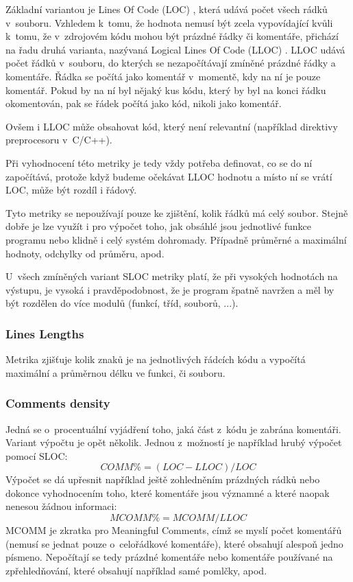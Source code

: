 \documentclass[11pt,twoside,a4paper]{book}
\begin{document}
Základní variantou je Lines Of Code (LOC) \cite{SLOC}, která udává počet všech rádků v~souboru. Vzhledem k~tomu, že hodnota
nemusí být zcela vypovídající kvůli k~tomu, že v~zdrojovém kódu mohou být prázdné řádky či komentáře, přichází
na řadu druhá varianta, nazývaná Logical Lines Of Code (LLOC) \cite{LLOC}. LLOC
udává počet řádků v~souboru, do kterých se nezapočítávají zmíněné prázdné řádky a komentáře. Řádka se počítá jako komentář
v~momentě, kdy na ní je pouze komentář. Pokud by na ní byl nějaký kus kódu, který by byl na konci řádku okomentován,
pak se řádek počítá jako kód, nikoli jako komentář.

Ovšem i LLOC může obsahovat kód, který není relevantní (například direktivy preprocesoru v~C/C++).

Při vyhodnocení této metriky je tedy vždy potřeba definovat, co se do ní započítává, protože když budeme
očekávat LLOC hodnotu a místo ní se vrátí LOC, může být rozdíl i řádový.

Tyto metriky se nepoužívají pouze ke zjištění, kolik řádků má celý soubor. Stejně dobře je lze využít i pro výpočet toho,
jak obsáhlé jsou jednotlivé funkce programu nebo klidně i celý systém dohromady. Případně průměrné a maximální hodnoty,
odchylky od průměru, apod.

U~všech zmíněných variant SLOC metriky platí, že při vysokých hodnotách na výstupu, je vysoká i pravděpodobnost,
že je program špatně navržen a měl by být rozdělen do více modulů (funkcí, tříd, souborů, ...).

\subsubsection{Lines Lengths}
Metrika zjišťuje kolik znaků je na jednotlivých řádcích kódu a vypočítá maximální a průměrnou délku ve funkci, či souboru.

\subsubsection{Comments density}
\label{sec:MCOMM}
Jedná se o~procentuální vyjádření toho, jaká část z~kódu je zabrána komentáři. Variant výpočtu je opět několik.
Jednou z~možností je například hrubý výpočet pomocí SLOC:
$$COMM\% = (LOC - LLOC) / LOC$$
Výpočet se dá upřesnit \cite{MCOMM} například ještě zohledněním prázdných rádků nebo dokonce vyhodnocením toho,
které komentáře jsou významné a které naopak nenesou žádnou informaci:
$$MCOMM\% = MCOMM / LLOC$$
MCOMM je zkratka pro Meaningful Comments, címž se myslí počet komentářů (nemusí se jednat pouze
o~celořádkové komentáře), které obsahují alespoň jedno písmeno. Nepočítají se tedy prázdné komentáře
nebo komentáře používané na zpřehledňování, které obsahují například samé pomlčky, apod.
\end{document}
